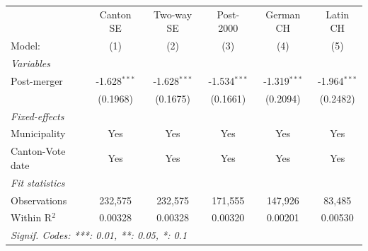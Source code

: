\begin{tabular}{lccccc}
   \tabularnewline \midrule \midrule
                    & Canton SE      & Two-way SE     & Post-2000      & German CH      & Latin CH \\   
   Model:           & (1)            & (2)            & (3)            & (4)            & (5)\\  
   \midrule
   \emph{Variables}\\
   Post-merger      & -1.628$^{***}$ & -1.628$^{***}$ & -1.534$^{***}$ & -1.319$^{***}$ & -1.964$^{***}$\\   
                    & (0.1968)       & (0.1675)       & (0.1661)       & (0.2094)       & (0.2482)\\   
   \midrule
   \emph{Fixed-effects}\\
   Municipality     & Yes            & Yes            & Yes            & Yes            & Yes\\  
   Canton-Vote date & Yes            & Yes            & Yes            & Yes            & Yes\\  
   \midrule
   \emph{Fit statistics}\\
   Observations     & 232,575        & 232,575        & 171,555        & 147,926        & 83,485\\  
   Within R$^2$     & 0.00328        & 0.00328        & 0.00320        & 0.00201        & 0.00530\\  
   \midrule \midrule
   \multicolumn{6}{l}{\emph{Signif. Codes: ***: 0.01, **: 0.05, *: 0.1}}\\
\end{tabular}
